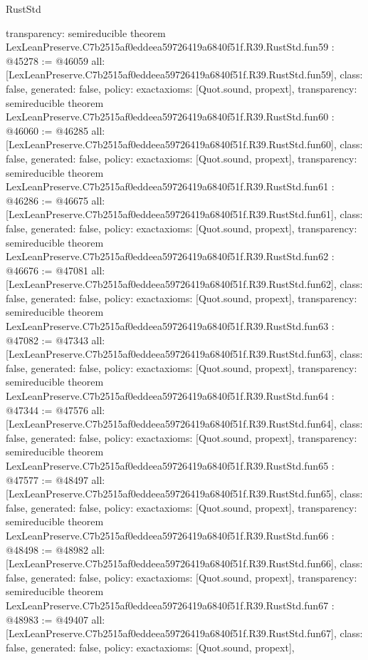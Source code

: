 \begin{lexlean}{RustStd}
\begin{coremodule}
{  transparency: semireducible
}
theorem LexLeanPreserve.C7b2515af0eddeea59726419a6840f51f.R39.RustStd.fun59 : @45278 := @46059 {
  all: [LexLeanPreserve.C7b2515af0eddeea59726419a6840f51f.R39.RustStd.fun59],
  class: false,
  generated: false,
  policy: exact{axioms: [Quot.sound, propext]},
  transparency: semireducible
}
theorem LexLeanPreserve.C7b2515af0eddeea59726419a6840f51f.R39.RustStd.fun60 : @46060 := @46285 {
  all: [LexLeanPreserve.C7b2515af0eddeea59726419a6840f51f.R39.RustStd.fun60],
  class: false,
  generated: false,
  policy: exact{axioms: [Quot.sound, propext]},
  transparency: semireducible
}
theorem LexLeanPreserve.C7b2515af0eddeea59726419a6840f51f.R39.RustStd.fun61 : @46286 := @46675 {
  all: [LexLeanPreserve.C7b2515af0eddeea59726419a6840f51f.R39.RustStd.fun61],
  class: false,
  generated: false,
  policy: exact{axioms: [Quot.sound, propext]},
  transparency: semireducible
}
theorem LexLeanPreserve.C7b2515af0eddeea59726419a6840f51f.R39.RustStd.fun62 : @46676 := @47081 {
  all: [LexLeanPreserve.C7b2515af0eddeea59726419a6840f51f.R39.RustStd.fun62],
  class: false,
  generated: false,
  policy: exact{axioms: [Quot.sound, propext]},
  transparency: semireducible
}
theorem LexLeanPreserve.C7b2515af0eddeea59726419a6840f51f.R39.RustStd.fun63 : @47082 := @47343 {
  all: [LexLeanPreserve.C7b2515af0eddeea59726419a6840f51f.R39.RustStd.fun63],
  class: false,
  generated: false,
  policy: exact{axioms: [Quot.sound, propext]},
  transparency: semireducible
}
theorem LexLeanPreserve.C7b2515af0eddeea59726419a6840f51f.R39.RustStd.fun64 : @47344 := @47576 {
  all: [LexLeanPreserve.C7b2515af0eddeea59726419a6840f51f.R39.RustStd.fun64],
  class: false,
  generated: false,
  policy: exact{axioms: [Quot.sound, propext]},
  transparency: semireducible
}
theorem LexLeanPreserve.C7b2515af0eddeea59726419a6840f51f.R39.RustStd.fun65 : @47577 := @48497 {
  all: [LexLeanPreserve.C7b2515af0eddeea59726419a6840f51f.R39.RustStd.fun65],
  class: false,
  generated: false,
  policy: exact{axioms: [Quot.sound, propext]},
  transparency: semireducible
}
theorem LexLeanPreserve.C7b2515af0eddeea59726419a6840f51f.R39.RustStd.fun66 : @48498 := @48982 {
  all: [LexLeanPreserve.C7b2515af0eddeea59726419a6840f51f.R39.RustStd.fun66],
  class: false,
  generated: false,
  policy: exact{axioms: [Quot.sound, propext]},
  transparency: semireducible
}
theorem LexLeanPreserve.C7b2515af0eddeea59726419a6840f51f.R39.RustStd.fun67 : @48983 := @49407 {
  all: [LexLeanPreserve.C7b2515af0eddeea59726419a6840f51f.R39.RustStd.fun67],
  class: false,
  generated: false,
  policy: exact{axioms: [Quot.sound, propext]},
}
\end{coremodule}
\end{lexlean}
